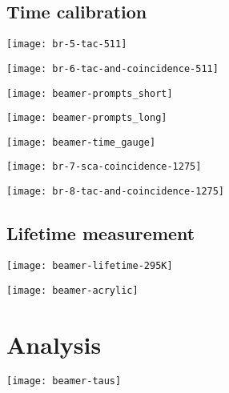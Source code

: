 \documentclass[english, fleqn]{beamer}
\begin{document}
\subsection{Time calibration}

\begin{frame}
    \texttt{[image: br-5-tac-511]}
\end{frame}


\begin{frame}
    \texttt{[image: br-6-tac-and-coincidence-511]}
\end{frame}


\begin{frame}
    \texttt{[image: beamer-prompts\_short]}
\end{frame}


\begin{frame}
    \texttt{[image: beamer-prompts\_long]}
\end{frame}


\begin{frame}
    \texttt{[image: beamer-time\_gauge]}
\end{frame}


\begin{frame}
    \texttt{[image: br-7-sca-coincidence-1275]}
\end{frame}


\begin{frame}
    \texttt{[image: br-8-tac-and-coincidence-1275]}
\end{frame}


\subsection{Lifetime measurement}

\begin{frame}
    \texttt{[image: beamer-lifetime-295K]}
\end{frame}


\begin{frame}
    \texttt{[image: beamer-acrylic]}
\end{frame}


\section{Analysis}

\begin{frame}
    \texttt{[image: beamer-taus]}
\end{frame}
\end{document}
